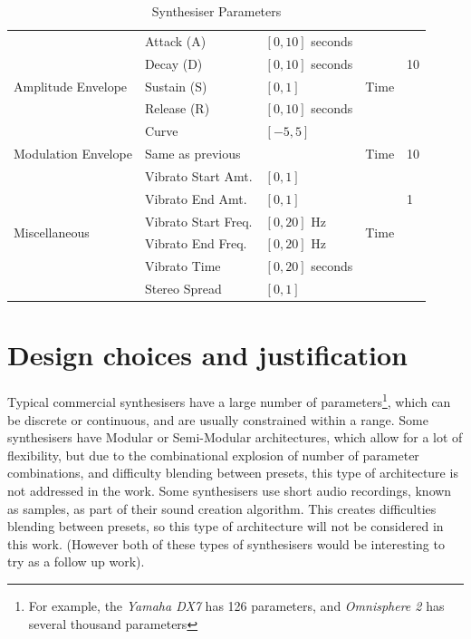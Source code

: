 \documentclass[11pt, oneside]{report}   	%
\begin{document}
\begin{table}[]
\begin{tabular}{|l|l|l|l|l|}
		\multirow{5}{*}{Amplitude Envelope}    & Attack (A)       				& $[0, 10]$ seconds        & \multirow{5}{*}{Time}& \multirow{3}{*}{10} \\
																	  & Decay (D)               		& $[0, 10]$ seconds         &                       			&\\
																	  & Sustain (S)             	 	 & $[0, 1]$                   		&                       			&\\
																	  & Release (R)             		& $[0, 10]$ seconds        &                       			&\\
																	  & Curve                   	   	   & $[-5, 5]$                  	&                       			&\\ \hline
		Modulation Envelope        						& Same as previous           &                            			& Time              	& 10									\\ \hline
		\multirow{6}{*}{Miscellaneous}             & Vibrato Start Amt.    		  & $[0, 1]$                   	& \multirow{6}{*}{Time}& \multirow{3}{*}{1} \\
																	  & Vibrato End Amt.	         & $[0, 1]$                   		&                       			&\\
																	  & Vibrato Start Freq.			  & $[0, 20]$ Hz               &                       			&\\
																	  & Vibrato End Freq.		      & $[0, 20]$ Hz               &                       			&\\
																	  & Vibrato Time            		& $[0, 20]$ seconds      &                       			&\\
																	  & Stereo Spread           	  & $[0, 1]$                   		&                       			&\\ \hline
	\end{tabular}
\caption{Synthesiser Parameters}
\label{tab:Params}
\end{table}

\section{Design choices and justification}\label{sec:SynthDescription}
Typical commercial synthesisers have a large number of parameters\footnote{For example, the \emph{Yamaha DX7} has 126 parameters, and  \emph{Omnisphere 2} has several thousand parameters}, which can be discrete or continuous, and are usually constrained within a range. Some synthesisers have Modular or Semi-Modular architectures, which allow for a lot of flexibility, but due to the combinational explosion of number of parameter combinations, and difficulty blending between presets, this type of architecture is not addressed in the work.
Some synthesisers use short audio recordings, known as samples, as part of their sound creation algorithm. This creates difficulties blending between presets, so this type of architecture will not be considered in this work. (However both of these types of synthesisers would be interesting to try as a follow up work).
\end{document}
